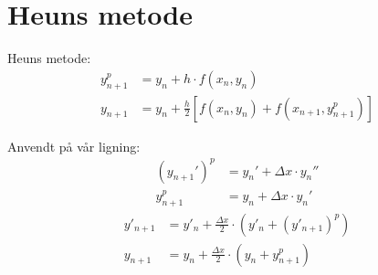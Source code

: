 \clearpage



\section{Heuns metode} %
\label{sec:heuns_metode}
Heuns metode:
\begin{align}
  y_{n+1}^p &=  y_n + h \cdot f(x_n,y_n) \\
  y_{n+1}   &=  y_n + \frac{h}{2} \left[f(x_n,y_n)+f(x_{n+1},y_{n+1}^p)\right]
\end{align}

Anvendt på vår ligning:
\begin{align}
  (y_{n+1}')^p & = y_n' + \Delta x \cdot y_n'' \\
  y_{n+1}^p  & = y_n  + \Delta x \cdot y_n'
\end{align}
\begin{align}
  y'_{n+1} & = y'_n + \frac{\Delta x}{2} \cdot (y'_n + (y'_{n+1})^p) \\
  y_{n+1}  & = y_n  + \frac{\Delta x}{2} \cdot (y_n + y_{n+1}^p)
\end{align}

